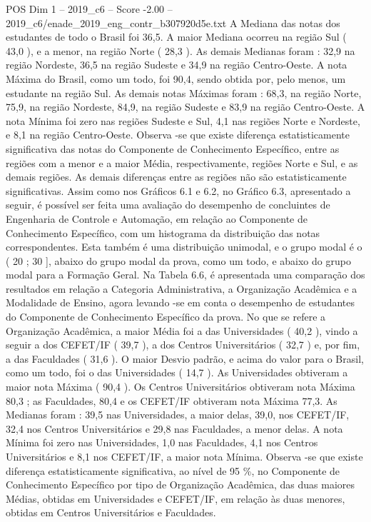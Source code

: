 \begin{textsample}{POS Dim 1 – 2019\_c6 – Score -2.00 – 2019\_c6/enade\_2019\_eng\_contr\_b307920d5e.txt}
A Mediana das notas dos estudantes de todo o Brasil foi 36,5.
A maior Mediana ocorreu na região Sul ( 43,0 ), e a menor, na região Norte ( 28,3 ).
As demais Medianas foram : 32,9 na região Nordeste, 36,5 na região Sudeste e 34,9 na região Centro-Oeste.
A nota Máxima do Brasil, como um todo, foi 90,4, sendo obtida por, pelo menos, um estudante na região Sul.
As demais notas Máximas foram : 68,3, na região Norte, 75,9, na região Nordeste, 84,9, na região Sudeste e 83,9 na região Centro-Oeste.
A nota Mínima foi zero nas regiões Sudeste e Sul, 4,1 nas regiões Norte e Nordeste, e 8,1 na região Centro-Oeste.
Observa -se que existe diferença estatisticamente significativa das notas do Componente de Conhecimento Específico, entre as regiões com a menor e a maior Média, respectivamente, regiões Norte e Sul, e as demais regiões.
As demais diferenças entre as regiões não são estatisticamente significativas.
Assim como nos Gráficos 6.1 e 6.2, no Gráfico 6.3, apresentado a seguir, é possível ser feita uma avaliação do desempenho de concluintes de Engenharia de Controle e Automação, em relação ao Componente de Conhecimento Específico, com um histograma da distribuição das notas correspondentes.
Esta também é uma distribuição unimodal, e o grupo modal é o ( 20 ; 30 ], abaixo do grupo modal da prova, como um todo, e abaixo do grupo modal para a Formação Geral.
Na Tabela 6.6, é apresentada uma comparação dos resultados em relação a Categoria Administrativa, a Organização Acadêmica e a Modalidade de Ensino, agora levando -se em conta o desempenho de estudantes do Componente de Conhecimento Específico da prova.
No que se refere a Organização Acadêmica, a maior Média foi a das Universidades ( 40,2 ), vindo a seguir a dos CEFET/IF ( 39,7 ), a dos Centros Universitários ( 32,7 ) e, por fim, a das Faculdades ( 31,6 ).
O maior Desvio padrão, e acima do valor para o Brasil, como um todo, foi o das Universidades ( 14,7 ).
As Universidades obtiveram a maior nota Máxima ( 90,4 ).
Os Centros Universitários obtiveram nota Máxima 80,3 ; as Faculdades, 80,4 e os CEFET/IF obtiveram nota Máxima 77,3.
As Medianas foram : 39,5 nas Universidades, a maior delas, 39,0, nos CEFET/IF, 32,4 nos Centros Universitários e 29,8 nas Faculdades, a menor delas.
A nota Mínima foi zero nas Universidades, 1,0 nas Faculdades, 4,1 nos Centros Universitários e 8,1 nos CEFET/IF, a maior nota Mínima.
Observa -se que existe diferença estatisticamente significativa, ao nível de 95 \%, no Componente de Conhecimento Específico por tipo de Organização Acadêmica, das duas maiores Médias, obtidas em Universidades e CEFET/IF, em relação às duas menores, obtidas em Centros Universitários e Faculdades.

\end{textsample}
